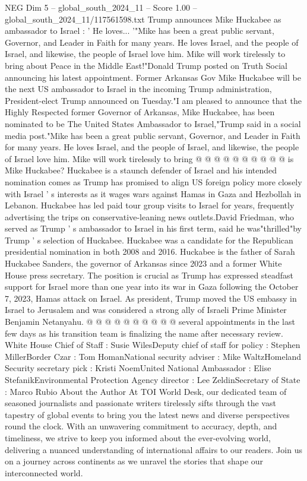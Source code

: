 \begin{textsample}{NEG Dim 5 – global\_south\_2024\_11 – Score 1.00 – global\_south\_2024\_11/117561598.txt}  \label{ex:f5_neg_422}
Trump announces Mike Huckabee as ambassador to Israel : ' He loves... '"Mike has been a great public servant, Governor, and Leader in Faith for many years.
He loves Israel, and the people of Israel, and likewise, the people of Israel love him.
Mike will work tirelessly to bring about Peace in the Middle East!"Donald Trump posted on Truth Social announcing his latest appointment.
Former Arkansas Gov Mike Huckabee will be the next US ambassador to Israel in the incoming Trump administration, President-elect Trump announced on Tuesday."I am pleased to announce that the Highly Respected former Governor of Arkansas, Mike Huckabee, has been nominated to be The United States Ambassador to Israel,"Trump said in a social media post."Mike has been a great public servant, Governor, and Leader in Faith for many years.
He loves Israel, and the people of Israel, and likewise, the people of Israel love him.
Mike will work tirelessly to bring @ @ @ @ @ @ @ @ @ @ is Mike Huckabee?
Huckabee is a staunch defender of Israel and his intended nomination comes as Trump has promised to align US foreign policy more closely with Israel ' s interests as it wages wars against Hamas in Gaza and Hezbollah in Lebanon.
Huckabee has led paid tour group visits to Israel for years, frequently advertising the trips on conservative-leaning news outlets.David Friedman, who served as Trump ' s ambassador to Israel in his first term, said he was"thrilled"by Trump ' s selection of Huckabee.
Huckabee was a candidate for the Republican presidential nomination in both 2008 and 2016.
Huckabee is the father of Sarah Huckabee Sanders, the governor of Arkansas since 2023 and a former White House press secretary.
The position is crucial as Trump has expressed steadfast support for Israel more than one year into its war in Gaza following the October 7, 2023, Hamas attack on Israel.
As president, Trump moved the US embassy in Israel to Jerusalem and was considered a strong ally of Israeli Prime Minister Benjamin Netanyahu. @ @ @ @ @ @ @ @ @ @ several appointments in the last few days as his transition team is finalizing the name after necessary review.
White House Chief of Staff : Susie WilesDeputy chief of staff for policy : Stephen MillerBorder Czar : Tom HomanNational security adviser : Mike WaltzHomeland Security secretary pick : Kristi NoemUnited National Ambassador : Elise StefanikEnvironmental Protection Agency director : Lee ZeldinSecretary of State : Marco Rubio About the Author At TOI World Desk, our dedicated team of seasoned journalists and passionate writers tirelessly sifts through the vast tapestry of global events to bring you the latest news and diverse perspectives round the clock.
With an unwavering commitment to accuracy, depth, and timeliness, we strive to keep you informed about the ever-evolving world, delivering a nuanced understanding of international affairs to our readers.
Join us on a journey across continents as we unravel the stories that shape our interconnected world.

\end{textsample}
